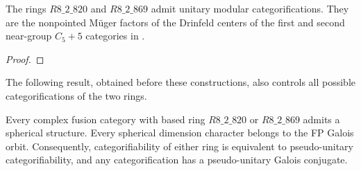 \begin{proposition}\label{prop:near-group-centralizers}
The rings $R8\_2\_820$ and $R8\_2\_869$ admit unitary modular
categorifications. They are the nonpointed M\"uger factors of
the Drinfeld centers of the first and second near-group
$C_5+5$ categories in \cite[Proposition~6 and Table~2]{EGNearGroup}.
\end{proposition}
\begin{proof}

\end{proof}

The following result, obtained before these constructions,
also controls all possible categorifications of the two rings.
\begin{proposition}\label{prop:simple-galois-pu}
Every complex fusion category with based ring $R8\_2\_820$ or
$R8\_2\_869$ admits a spherical structure. Every spherical
dimension character belongs to the FP Galois orbit. Consequently,
categorifiability of either ring is equivalent to pseudo-unitary
categorifiability, and any categorification has a pseudo-unitary
Galois conjugate.
\end{proposition}
